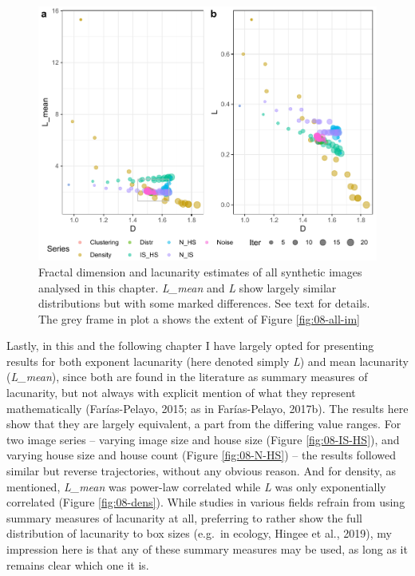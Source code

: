 \documentclass[
  12pt,
]{book}
\begin{document}
\begin{figure}

{\centering \includegraphics[width=0.9\linewidth]{bookdown-demo_files/figure-latex/08-all-1} 

}

\caption{Fractal dimension and lacunarity estimates of all synthetic images analysed in this chapter. \emph{L\_mean} and \emph{L} show largely similar distributions but with some marked differences. See text for details. The grey frame in plot a shows the extent of Figure \ref{fig:08-all-im}}\label{fig:08-all}
\end{figure}

Lastly, in this and the following chapter I have largely opted for presenting results for both exponent lacunarity (here denoted simply \emph{L}) and mean lacunarity (\emph{L\_mean}), since both are found in the literature as summary measures of lacunarity, but not always with explicit mention of what they represent mathematically (Farías-Pelayo, 2015; as in Farías-Pelayo, 2017b). The results here show that they are largely equivalent, a part from the differing value ranges. For two image series -- varying image size and house size (Figure \ref{fig:08-IS-HS}), and varying house size and house count (Figure \ref{fig:08-N-HS}) -- the results followed similar but reverse trajectories, without any obvious reason. And for density, as mentioned, \emph{L\_mean} was power-law correlated while \emph{L} was only exponentially correlated (Figure \ref{fig:08-dens}). While studies in various fields refrain from using summary measures of lacunarity at all, preferring to rather show the full distribution of lacunarity to box sizes (e.g.~in ecology, Hingee et al., 2019), my impression here is that any of these summary measures may be used, as long as it remains clear which one it is.
\end{document}

